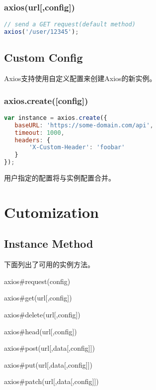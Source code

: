 \subsection{axios(url[,config])}



\begin{lstlisting}[language=JavaScript]
// send a GET request(default method)
axios('/user/12345');
\end{lstlisting}

\section{Custom Config}

Axios支持使用自定义配置来创建Axios的新实例。

\subsection{axios.create([config])}



\begin{lstlisting}[language=JavaScript]
var instance = axios.create({
   baseURL: 'https://some-domain.com/api',
   timeout: 1000,
   headers: {
       'X-Custom-Header': 'foobar'
   }
});
\end{lstlisting}

用户指定的配置将与实例配置合并。

\chapter{Cutomization}

\section{Instance Method}


下面列出了可用的实例方法。 

\begin{compactitem}
\item axios\#request(config)
\item axios\#get(url[,config])
\item axios\#delete(url[,config])
\item axios\#head(url[,config])
\item axios\#post(url[,data[,config]])
\item axios\#put(url[,data[,config]])
\item axios\#patch(url[,data[,config]])
\end{compactitem}







